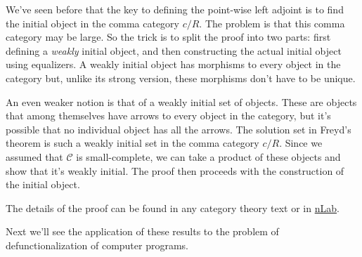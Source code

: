 \documentclass[11pt]{amsart}
\begin{document}
We've seen before that the key to defining the point-wise left adjoint is to find the initial object in the comma category $c/R$. The problem is that this comma category may be large. So the trick is to split the proof into two parts: first defining a \emph{weakly} initial object, and then constructing the actual initial object using equalizers. A weakly initial object has morphisms to every object in the category but, unlike its strong version, these morphisms don't have to be unique. 

An even weaker notion is that of a weakly initial set of objects. These are objects that among themselves have arrows to every object in the category, but it's possible that no individual object has all the arrows. The solution set in Freyd's theorem is such a weakly initial set in the comma category $c/R$. Since we assumed that $\mathcal C$ is small-complete, we can take a product of these objects and show that it's weakly initial. The proof then proceeds with the construction of the initial object. 

The details of the proof can be found in any category theory text or in \href{https://ncatlab.org/nlab/show/adjoint+functor+theorem}{nLab}. 

Next we'll see the application of these results to the problem of defunctionalization of computer programs.
\end{document}
